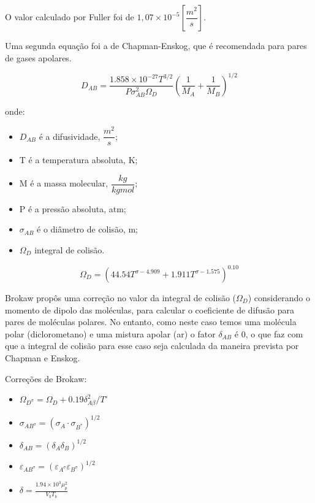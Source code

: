 O valor calculado por Fuller foi de $1,07 \times 10^{-5} [\dfrac{m^{2}}{s}]$.

Uma segunda equação foi a de Chapman-Enskog, que é recomendada para pares de gases apolares. 

\begin{equation}\label{key}
D_{A B}=\frac{1.858 \times 10^{-27} T^{3 / 2}}{P \sigma_{A B}^{2} \Omega_{D}}\left(\frac{1}{M_{A}}+\frac{1}{M_{B}}\right)^{1 / 2}
\end{equation}

onde:

\begin{itemize}

\item $D_{AB}$ é a difusividade, $\dfrac{m^{2}}{s}$;
\item T é a temperatura absoluta, K;
\item M é a massa molecular, $\dfrac{kg}{kgmol}$;
\item P é a pressão absoluta, atm;
\item $\sigma_{AB}$ é o diâmetro de colisão, m;
\item $\Omega_{D}$ integral de colisão.

\end{itemize}



\begin{equation}\label{key}
\Omega_{D}=\left(44.54 T^{\sigma-4.909}+1.911 T^{\sigma-1.575}\right)^{0.10}
\end{equation}

Brokaw propôs uma correção no valor da integral de colisão ($\Omega_{D}$) considerando o momento de dipolo das moléculas, para calcular o coeficiente de difusão para pares de moléculas polares. No entanto, como neste caso temos uma molécula polar (diclorometano) e uma mistura apolar (ar) o fator $\delta_{A B}$ é 0, o que faz com que a integral de colisão para esse caso seja calculada da maneira prevista por Chapman e Enskog.

Correções de Brokaw:

\begin{itemize}
\item $\Omega_{D^{\sigma}}=\Omega_{D}+0.19 \delta_{A \beta}^{2} / T^{\circ}$

\item $\sigma_{A B^{\sigma}}=\left(\sigma_{A} \cdot \sigma_{B^{*}}\right)^{1 / 2}$

\item $\delta_{A B}=\left(\delta_{A} \delta_{B}\right)^{1 / 2}$

\item $\varepsilon_{A B^{\sigma}}=\left(\varepsilon_{A^{\sigma}} \varepsilon_{B^{\sigma}}\right)^{1 / 2}$

\item $\delta=\frac{1.94 \times 10^{3} \mu_{p}^{2}}{V_{b} T_{b}}$

\end{itemize}


